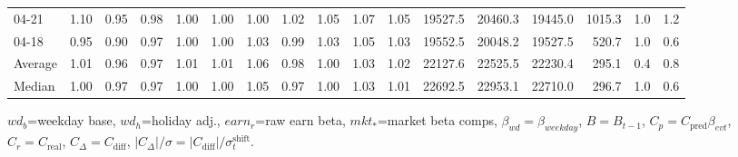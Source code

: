 \begin{threeparttable}
{\begin{tabular}{lrrrrrrrrrrrrrrrr}
  04-21 &   1.10 &   0.95 &         0.98 &     1.00 &           1.00 &        1.00 &        1.02 &        1.05 &          1.07 &          1.05 & 19527.5 & 20460.3 & 19445.0 &     1015.3 &                      1.0 &                 1.2 \\
  04-18 &   0.95 &   0.90 &         0.97 &     1.00 &           1.00 &        1.03 &        0.99 &        1.03 &          1.05 &          1.03 & 19552.5 & 20048.2 & 19527.5 &      520.7 &                      1.0 &                 0.6 \\
Average &   1.01 &   0.96 &         0.97 &     1.01 &           1.01 &        1.06 &        0.98 &        1.00 &          1.03 &          1.02 & 22127.6 & 22525.5 & 22230.4 &      295.1 &                      0.4 &                 0.8 \\
 Median &   1.00 &   0.97 &         0.97 &     1.00 &           1.00 &        1.05 &        0.97 &        1.00 &          1.03 &          1.01 & 22692.5 & 22953.1 & 22710.0 &      296.7 &                      1.0 &                 0.6 \\
\bottomrule
\end{tabular}
}
\begin{tablenotes}\footnotesize
\item $wd_b$=weekday base, $wd_h$=holiday adj.,
$earn_r$=raw earn beta, $mkt_{*}$=market beta comps,
$\beta_{wd}=\beta_{weekday}$, $B=B_{t-1}$,
$C_p=C_{\text{pred}}\beta_{evt}$, $C_r=C_{\text{real}}$,
$C_\Delta=C_{\text{diff}}$, $|C_\Delta|/\sigma=|C_{\text{diff}}|/\sigma_t^{\text{shift}}$.
\end{tablenotes}
\end{threeparttable}
\endgroup
